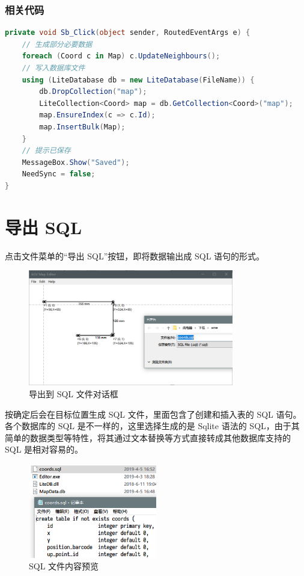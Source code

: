 \subsubsection{相关代码}

\begin{lstlisting}[language=cs]
private void Sb_Click(object sender, RoutedEventArgs e) {
    // 生成部分必要数据
    foreach (Coord c in Map) c.UpdateNeighbours();
    // 写入数据库文件
    using (LiteDatabase db = new LiteDatabase(FileName)) {
        db.DropCollection("map");
        LiteCollection<Coord> map = db.GetCollection<Coord>("map");
        map.EnsureIndex(c => c.Id);
        map.InsertBulk(Map);
    }
    // 提示已保存
    MessageBox.Show("Saved");
    NeedSync = false;
}
\end{lstlisting}

\section{导出 SQL}

点击文件菜单的``导出 SQL''按钮，即将数据输出成 SQL 语句的形式。

\begin{figure}[H]
  \centering
  \includegraphics[width=0.8\textwidth]{assets/export.png}
  \caption{导出到 SQL 文件对话框}
  \label{fig:export}
\end{figure}

按确定后会在目标位置生成 SQL 文件，里面包含了创建和插入表的 SQL 语句。各个数据库的 SQL 是不一样的，这里选择生成的是 Sqlite 语法的 SQL，由于其简单的数据类型等特性，将其通过文本替换等方式直接转成其他数据库支持的 SQL 是相对容易的。

\begin{figure}[H]
  \centering
  \includegraphics[width=0.5\textwidth]{assets/sql.png}
  \caption{SQL 文件内容预览}
  \label{fig:sql}
\end{figure}

